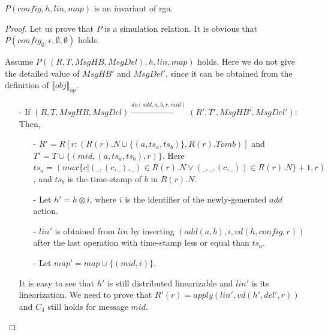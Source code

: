 {\begin{lemma}
\label{lemma:P is an invariant of rga}
$P(\mathit{config},h,\mathit{lin},\mathit{map})$ is an invariant of rga.
\end{lemma}

\begin {proof}

Let us prove that $P$ is a simulation relation. It is obvious that $P(\mathit{config}_0,\epsilon,\emptyset,\emptyset)$ holds.

Assume $P((R,T,\mathit{MsgHB},\mathit{MsgDel}),h,\mathit{lin},\mathit{map})$ holds. Here we do not give the detailed value of $\mathit{MsgHB}'$ and $\mathit{MsgDel}'$, since it can be obtained from the definition of $\llbracket \mathit{obj} \rrbracket_{\mathit{op}}$.

\begin{itemize}
\setlength{\itemsep}{0.5pt}
\item[-] If $(R,T,\mathit{MsgHB},\mathit{MsgDel}) {\xrightarrow{\mathit{do}(\mathit{add},a,b,r,\mathit{mid})}} (R',T',\mathit{MsgHB}',\mathit{MsgDel}')$: Then,

    \begin{itemize}
    \setlength{\itemsep}{0.5pt}
    \item[-] $R' = R[ r: (R(r).N \cup \{ (a,\mathit{ts}_a,\mathit{ts}_b) \}, R(r).\mathit{Tomb}) ]$ and $T' = T \cup \{ (\mathit{mid},(a,\mathit{ts}_a,\mathit{ts}_b),r) \}$. Here $\mathit{ts}_a = ( \mathit{max} \{ c \vert (\_,(c,\_),\_) \in R(r).N \vee (\_,\_,(c,\_)) \in R(r).N \} +1,r)$, and $\mathit{ts}_b$ is the time-stamp of $b$ in $R(r).N$.

    \item[-] Let $h' = h \otimes i$, where $i$ is the identifier of the newly-generated $\mathit{add}$ action.

    \item[-] $\mathit{lin}'$ is obtained from $\mathit{lin}$ by inserting $(\mathit{add}(a,b),i,\mathit{vd}(h,\mathit{config},r))$ after the last operation with time-stamp less or equal than $\mathit{ts}_a$.

    \item[-] Let $\mathit{map}' = \mathit{map} \cup \{ (\mathit{mid},i) \}$.
    \end{itemize}

    It is easy to see that $h'$ is still distributed linearizable and $\mathit{lin}'$ is its linearization. We need to prove that $R'(r) = \mathit{apply}(\mathit{lin}',\mathit{vd}(h',\mathit{del}',r))$ and $C_4$ still holds for message $\mathit{mid}$.


\end{itemize}
\end{proof}}
